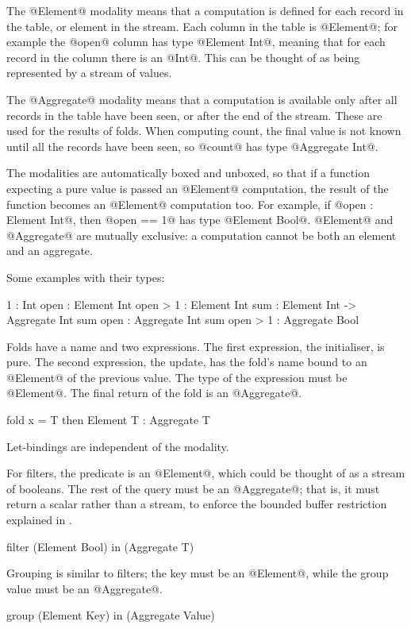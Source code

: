 The @Element@ modality means that a computation is defined for each record in the table, or element in the stream.
Each column in the table is @Element@; for example the @open@ column has type @Element Int@, meaning that for each record in the column there is an @Int@.
This can be thought of as being represented by a stream of values.

The @Aggregate@ modality means that a computation is available only after all records in the table have been seen, or after the end of the stream.
These are used for the results of folds.
When computing count, the final value is not known until all the records have been seen, so @count@ has type @Aggregate Int@.

The modalities are automatically boxed and unboxed, so that if a function expecting a pure value is passed an @Element@ computation, the result of the function becomes an @Element@ computation too.
For example, if @open : Element Int@, then @open == 1@ has type @Element Bool@.
@Element@ and @Aggregate@ are mutually exclusive: a computation cannot be both an element and an aggregate.

Some examples with their types:
\begin{code}
1             :         Int
open          : Element Int
open > 1      : Element Int
sum           : Element Int -> Aggregate Int
sum open      : Aggregate Int
sum open > 1  : Aggregate Bool
\end{code}

Folds have a name and two expressions.
The first expression, the initialiser, is pure.
The second expression, the update, has the fold's name bound to an @Element@ of the previous value.
The type of the expression must be @Element@.
The final return of the fold is an @Aggregate@.
\begin{code}
fold x = T then Element T : Aggregate T
\end{code}

Let-bindings are independent of the modality.

For filters, the predicate is an @Element@, which could be thought of as a stream of booleans.
The rest of the query must be an @Aggregate@; that is, it must return a scalar rather than a stream, to enforce the bounded buffer restriction explained in .
\begin{code}
filter (Element Bool) in (Aggregate T)
\end{code}

Grouping is similar to filters; the key must be an @Element@, while the group value must be an @Aggregate@.
\begin{code}
group (Element Key) in (Aggregate Value)
\end{code}

